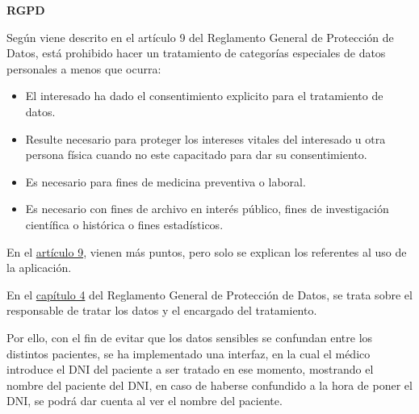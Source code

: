 \textbf{RGPD}

Según viene descrito en el artículo 9 del Reglamento General de Protección de Datos, está prohibido hacer un tratamiento de categorías especiales de datos personales a menos que ocurra:
\begin{itemize}
    \item El interesado ha dado el consentimiento explicito para el tratamiento de datos.
    \item Resulte necesario para proteger los intereses vitales del interesado u otra persona física cuando no este capacitado para dar su consentimiento.
    \item Es necesario para fines de medicina preventiva o laboral.
    \item Es necesario con fines de archivo en interés público, fines de investigación científica o histórica o fines estadísticos.
\end{itemize}

En el \href{https://www.boe.es/doue/2016/119/L00001-00088.pdf#page=38}{artículo 9}, vienen más puntos, pero solo se explican los referentes al uso de la aplicación.

En el \href{https://www.boe.es/doue/2016/119/L00001-00088.pdf#page=47}{capítulo 4} del Reglamento General de Protección de Datos, se trata sobre el responsable de  tratar los datos y  el encargado del tratamiento.

Por ello, con el fin de evitar que los datos sensibles se confundan entre los distintos pacientes, se ha implementado una interfaz, en la cual el médico introduce el DNI del paciente a ser tratado en ese momento, mostrando el nombre del paciente del DNI, en caso de haberse confundido a la hora de poner el DNI, se podrá dar cuenta al ver el nombre del paciente. 
